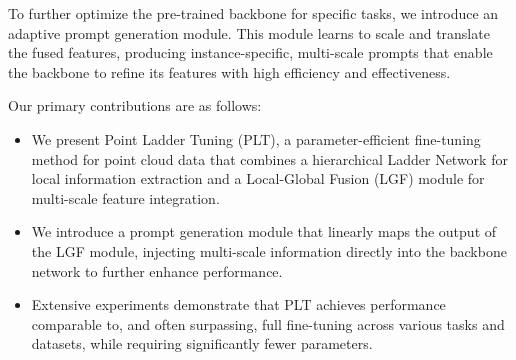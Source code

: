 To further optimize the pre-trained backbone for specific tasks, we introduce an adaptive prompt generation module. This module learns to scale and translate the fused features, producing instance-specific, multi-scale prompts that enable the backbone to refine its features with high efficiency and effectiveness.

Our primary contributions are as follows:

\begin{itemize} 
	\item We present Point Ladder Tuning (PLT), a parameter-efficient fine-tuning method for point cloud data that combines a hierarchical Ladder Network for local information extraction and a Local-Global Fusion (LGF) module for multi-scale feature integration. 
	\item We introduce a prompt generation module that linearly maps the output of the LGF module, injecting multi-scale information directly into the backbone network to further enhance performance. \item Extensive experiments demonstrate that PLT achieves performance comparable to, and often surpassing, full fine-tuning across various tasks and datasets, while requiring significantly fewer parameters. 
\end{itemize}



